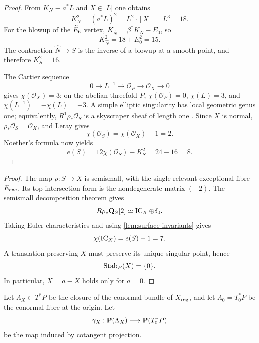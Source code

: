 \begin{proof}
From $K_N\equiv a^*L$ and $X\in|L|$ one obtains
\[
 K_N^2=(a^*L)^2=L^2\cdot[X]=L^3=18.
\]
For the blowup of the $\widetilde E_6$ vertex,
$K_{\widehat N}=\beta^*K_N-E_0$, so
\[
 K_{\widehat N}^2=18+E_0^2=15.
\]
The contraction $\widehat N\to S$ is the inverse of a blowup at a smooth
point, and therefore $K_S^2=16$.

The Cartier sequence
\[
 0\longrightarrow L^{-1}\longrightarrow\mathcal O_P
 \longrightarrow\mathcal O_X\longrightarrow0
\]
gives $\chi(\mathcal O_X)=3$: on the abelian threefold $P$,
$\chi(\mathcal O_P)=0$, $\chi(L)=3$, and
$\chi(L^{-1})=-\chi(L)=-3$.  A simple elliptic singularity has local
geometric genus one; equivalently,
$R^1\rho_*\mathcal O_S$ is a skyscraper sheaf of length one
\cite{Laufer1977}.  Since $X$ is normal,
$\rho_*\mathcal O_S=\mathcal O_X$, and Leray gives
\[
 \chi(\mathcal O_S)=\chi(\mathcal O_X)-1=2.
\]
Noether's formula now yields
\[
 e(S)=12\chi(\mathcal O_S)-K_S^2=24-16=8.
\]
\end{proof}


\begin{proof}
The map $\rho:S\to X$ is semismall, with the single relevant exceptional
fibre $E_{\mathrm{exc}}$.  Its top intersection form is the nondegenerate matrix
$(-2)$.  The semismall decomposition theorem
\cite[Theorem~3.4.1]{deCataldoMigliorini2002} gives
\begin{equation}
 R\rho_*\mathbf Q_S[2]\simeq\operatorname{IC}_X\oplus\delta_0.
\label{eq:semismall}
\end{equation}
Taking Euler characteristics and using \cref{lem:surface-invariants} gives
\begin{equation}
 \chi(\operatorname{IC}_X)=e(S)-1=7.
\label{eq:chi-seven}
\end{equation}
A translation preserving $X$ must preserve its unique singular point, hence
\begin{equation}
 \operatorname{Stab}_P(X)=\{0\}.
\label{eq:stabilizer}
\end{equation}
In particular, $X=a-X$ holds only for $a=0$.
\end{proof}

Let $\Lambda_X\subset T^*P$ be the closure of the conormal bundle of
$X_{\mathrm{reg}}$, and let $\Lambda_0=T_0^*P$ be the conormal fibre at the origin.
Let
\[
 \gamma_X:\mathbf P(\Lambda_X)\longrightarrow\mathbf P(T_0^*P)
\]
be the map induced by cotangent projection.

